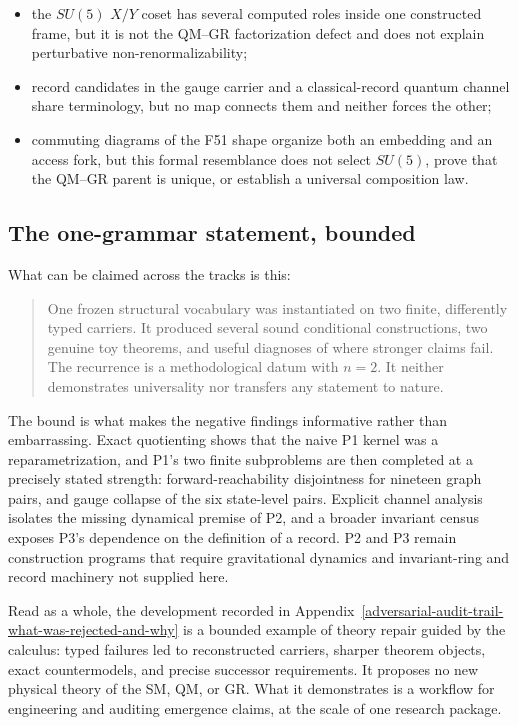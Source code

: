 \documentclass[11pt]{article}
\theoremstyle{definition}
\providecommand{\tightlist}{\setlength{\itemsep}{0pt}\setlength{\parskip}{0pt}}
\begin{document}
\begin{itemize}\tightlist
\item the \(SU(5)\) \(X/Y\) coset has several computed roles inside one constructed frame, but it is not the QM--GR
  factorization defect and does not explain perturbative non-renormalizability;
\item record candidates in the gauge carrier and a classical-record quantum channel share terminology, but no map
  connects them and neither forces the other;
\item commuting diagrams of the F51 shape organize both an embedding and an access fork, but this formal resemblance
  does not select \(SU(5)\), prove that the QM--GR parent is unique, or establish a universal composition law.
\end{itemize}

\subsection{The one-grammar statement, bounded}\label{the-one-grammar-thesis}

What can be claimed across the tracks is this:

\begin{quote}
One frozen structural vocabulary was instantiated on two finite, differently typed carriers. It produced several sound
conditional constructions, two genuine toy theorems, and useful diagnoses of where stronger claims fail. The
recurrence is a methodological datum with \(n=2\). It neither demonstrates universality nor transfers any statement to
nature.
\end{quote}

The bound is what makes the negative findings informative rather than embarrassing. Exact quotienting shows that the
naive P1 kernel was a reparametrization, and P1's two finite subproblems are then completed at a precisely stated
strength: forward-reachability disjointness for nineteen graph pairs, and gauge collapse of the six state-level pairs.
Explicit channel analysis isolates the missing dynamical premise of P2, and a broader invariant census exposes P3's
dependence on the definition of a record. P2 and P3 remain construction programs that require gravitational dynamics
and invariant-ring and record machinery not supplied here.

Read as a whole, the development recorded in Appendix~\ref{adversarial-audit-trail-what-was-rejected-and-why} is a
bounded example of theory repair guided by the calculus: typed failures led to reconstructed carriers, sharper theorem
objects, exact countermodels, and precise successor requirements. It proposes no new physical theory of the SM, QM,
or GR. What it demonstrates is a workflow for engineering and auditing emergence claims, at the scale of one research
package.
\end{document}
